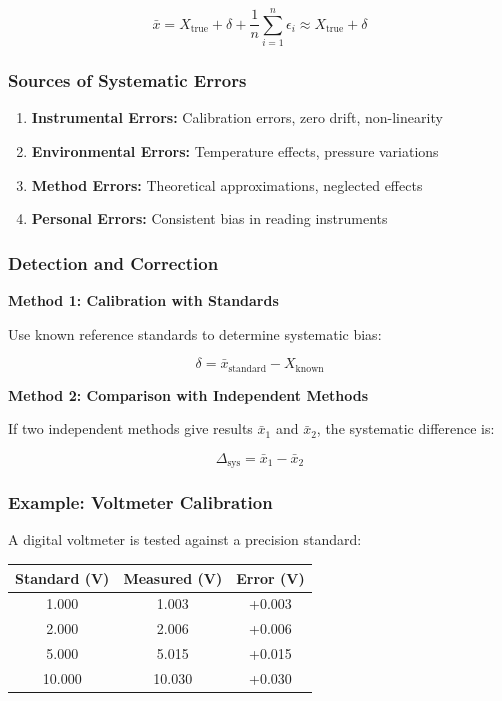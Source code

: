 \documentclass[twoside]{book}
\begin{document}
\begin{equation*}
\bar{x} = X_{\text{true}} + \delta + \frac{1}{n}\sum_{i=1}^{n}\epsilon_i \approx X_{\text{true}} + \delta
\end{equation*}

\subsubsection{Sources of Systematic Errors}

\begin{enumerate}
\item \textbf{Instrumental Errors:} Calibration errors, zero drift, non-linearity
\item \textbf{Environmental Errors:} Temperature effects, pressure variations
\item \textbf{Method Errors:} Theoretical approximations, neglected effects
\item \textbf{Personal Errors:} Consistent bias in reading instruments
\end{enumerate}

\subsubsection{Detection and Correction}

\textbf{Method 1: Calibration with Standards}

Use known reference standards to determine systematic bias:

\begin{equation}
\delta = \bar{x}_{\text{standard}} - X_{\text{known}}
\end{equation}

\textbf{Method 2: Comparison with Independent Methods}

If two independent methods give results $\bar{x}_1$ and $\bar{x}_2$, the systematic difference is:

\begin{equation}
\Delta_{\text{sys}} = \bar{x}_1 - \bar{x}_2
\end{equation}

\subsubsection{Example: Voltmeter Calibration}

A digital voltmeter is tested against a precision standard:

\begin{center}
\begin{tabular}{ccc}
\toprule
Standard (V) & Measured (V) & Error (V) \\
\midrule
1.000 & 1.003 & +0.003 \\
2.000 & 2.006 & +0.006 \\
5.000 & 5.015 & +0.015 \\
10.000 & 10.030 & +0.030 \\
\bottomrule
\end{tabular}
\end{center}
\end{document}
